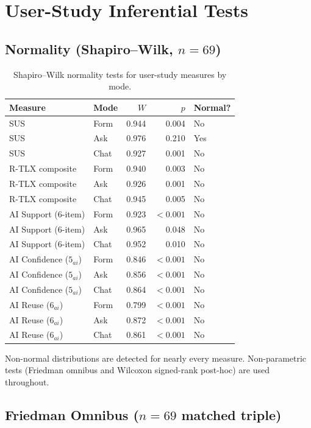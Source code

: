 \section{User-Study Inferential Tests}
\label{app:inf-survey}

\subsection{Normality (Shapiro--Wilk, $n = 69$)}

\begin{table}[H]
\centering
\small
\begin{tabular}{@{}l l r r l@{}}
\toprule
Measure & Mode & $W$ & $p$ & Normal? \\
\midrule
SUS & Form & 0.944 & 0.004 & No \\
SUS & Ask  & 0.976 & 0.210 & Yes \\
SUS & Chat & 0.927 & 0.001 & No \\
R-TLX composite & Form & 0.940 & 0.003 & No \\
R-TLX composite & Ask  & 0.926 & 0.001 & No \\
R-TLX composite & Chat & 0.945 & 0.005 & No \\
AI Support (6-item) & Form & 0.923 & $<0.001$ & No \\
AI Support (6-item) & Ask  & 0.965 & 0.048 & No \\
AI Support (6-item) & Chat & 0.952 & 0.010 & No \\
AI Confidence ($5_{ai}$) & Form & 0.846 & $<0.001$ & No \\
AI Confidence ($5_{ai}$) & Ask  & 0.856 & $<0.001$ & No \\
AI Confidence ($5_{ai}$) & Chat & 0.864 & $<0.001$ & No \\
AI Reuse ($6_{ai}$) & Form & 0.799 & $<0.001$ & No \\
AI Reuse ($6_{ai}$) & Ask  & 0.872 & $<0.001$ & No \\
AI Reuse ($6_{ai}$) & Chat & 0.861 & $<0.001$ & No \\
\bottomrule
\end{tabular}
\caption{Shapiro--Wilk normality tests for user-study measures by mode.}
\label{tab:app-survey-normality}
\end{table}

Non-normal distributions are detected for nearly every measure. Non-parametric
tests (Friedman omnibus and Wilcoxon signed-rank post-hoc) are used
throughout.

\subsection{Friedman Omnibus ($n = 69$ matched triple)}

